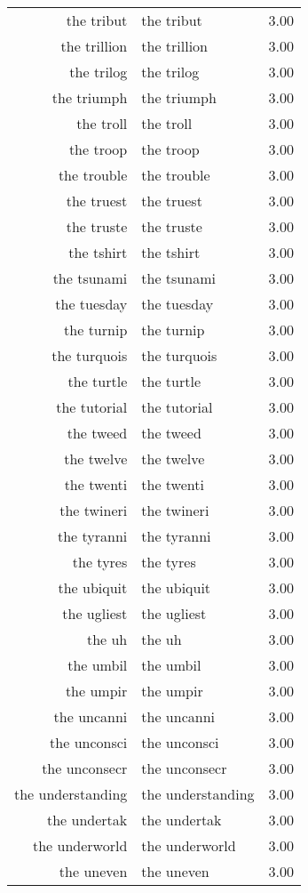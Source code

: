 \begin{table}[ht]
\begin{tabular}{rlr}
  the tribut & the tribut & 3.00 \\ 
  the trillion & the trillion & 3.00 \\ 
  the trilog & the trilog & 3.00 \\ 
  the triumph & the triumph & 3.00 \\ 
  the troll & the troll & 3.00 \\ 
  the troop & the troop & 3.00 \\ 
  the trouble & the trouble & 3.00 \\ 
  the truest & the truest & 3.00 \\ 
  the truste & the truste & 3.00 \\ 
  the tshirt & the tshirt & 3.00 \\ 
  the tsunami & the tsunami & 3.00 \\ 
  the tuesday & the tuesday & 3.00 \\ 
  the turnip & the turnip & 3.00 \\ 
  the turquois & the turquois & 3.00 \\ 
  the turtle & the turtle & 3.00 \\ 
  the tutorial & the tutorial & 3.00 \\ 
  the tweed & the tweed & 3.00 \\ 
  the twelve & the twelve & 3.00 \\ 
  the twenti & the twenti & 3.00 \\ 
  the twineri & the twineri & 3.00 \\ 
  the tyranni & the tyranni & 3.00 \\ 
  the tyres & the tyres & 3.00 \\ 
  the ubiquit & the ubiquit & 3.00 \\ 
  the ugliest & the ugliest & 3.00 \\ 
  the uh & the uh & 3.00 \\ 
  the umbil & the umbil & 3.00 \\ 
  the umpir & the umpir & 3.00 \\ 
  the uncanni & the uncanni & 3.00 \\ 
  the unconsci & the unconsci & 3.00 \\ 
  the unconsecr & the unconsecr & 3.00 \\ 
  the understanding & the understanding & 3.00 \\ 
  the undertak & the undertak & 3.00 \\ 
  the underworld & the underworld & 3.00 \\ 
  the uneven & the uneven & 3.00 \\ 

\end{tabular}
\end{table}

